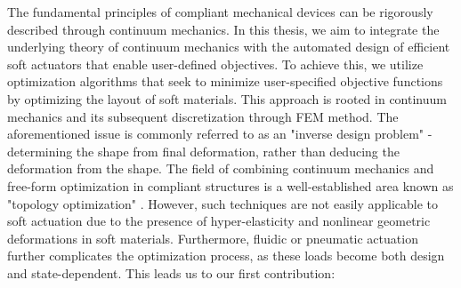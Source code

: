 The fundamental principles of compliant mechanical devices can be rigorously described through continuum mechanics. In this thesis, we aim to integrate the underlying theory of continuum mechanics with the automated design of efficient soft actuators that enable user-defined objectives. To achieve this, we utilize optimization algorithms that seek to minimize user-specified objective functions by optimizing the layout of soft materials. This approach is rooted in continuum mechanics \cite{Holzapfel2002,Kim2018} and its subsequent discretization through FEM method. The aforementioned issue is commonly referred to as an "inverse design problem" - determining the shape from final deformation, rather than deducing the deformation from the shape. The field of combining continuum mechanics and free-form optimization in compliant structures is a well-established area known as "topology optimization" \cite{Bendsoe2003}. However, such techniques are not easily applicable to soft actuation due to the presence of hyper-elasticity and nonlinear geometric deformations in soft materials. Furthermore, fluidic or pneumatic actuation further complicates the optimization process, as these loads become both design and state-dependent. This leads us to our first contribution:

